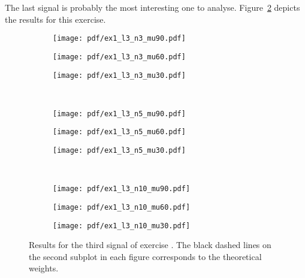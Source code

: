 The last signal is probably the most interesting one to analyse.
Figure~\ref{fig:ex1vsig3} depicts the results for this exercise.
\begin{figure}[h]
    \centering
    \begin{subfigure}[t]{0.30\columnwidth}
        \centering
        \texttt{[image: pdf/ex1\_l3\_n3\_mu90.pdf]}
        \caption{}
    \end{subfigure} \hfill
    \begin{subfigure}[t]{0.30\columnwidth}
        \centering
        \texttt{[image: pdf/ex1\_l3\_n3\_mu60.pdf]}
        \caption{}
    \end{subfigure} \hfill
    \begin{subfigure}[t]{0.30\columnwidth}
        \centering
        \texttt{[image: pdf/ex1\_l3\_n3\_mu30.pdf]}
        \caption{}
    \end{subfigure} \\
    \begin{subfigure}[t]{0.30\columnwidth}
        \centering
        \texttt{[image: pdf/ex1\_l3\_n5\_mu90.pdf]}
        \caption{}
    \end{subfigure} \hfill
    \begin{subfigure}[t]{0.30\columnwidth}
        \centering
        \texttt{[image: pdf/ex1\_l3\_n5\_mu60.pdf]}
        \caption{}
    \end{subfigure} \hfill
    \begin{subfigure}[t]{0.30\columnwidth}
        \centering
        \texttt{[image: pdf/ex1\_l3\_n5\_mu30.pdf]}
        \caption{}
    \end{subfigure} \\
    \begin{subfigure}[t]{0.30\columnwidth}
        \centering
        \texttt{[image: pdf/ex1\_l3\_n10\_mu90.pdf]}
        \caption{}
    \end{subfigure} \hfill
    \begin{subfigure}[t]{0.30\columnwidth}
        \centering
        \texttt{[image: pdf/ex1\_l3\_n10\_mu60.pdf]}
        \caption{}
    \end{subfigure} \hfill
    \begin{subfigure}[t]{0.30\columnwidth}
        \centering
        \texttt{[image: pdf/ex1\_l3\_n10\_mu30.pdf]}
        \caption{\label{fig:ex1vsig3n10mu3}}
    \end{subfigure}
    \caption{Results for the third signal of exercise . The black dashed lines on
        the second subplot in each figure corresponds to the theoretical weights.
        \label{fig:ex1vsig3}}
\end{figure}
